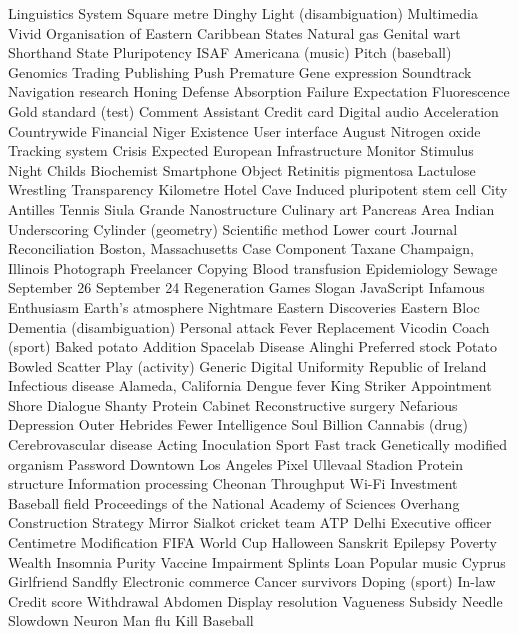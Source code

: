 Linguistics  System  Square metre  
Dinghy  Light (disambiguation)  Multimedia  
Vivid  Organisation of Eastern Caribbean States  Natural gas  
Genital wart  Shorthand  State  
Pluripotency  ISAF  Americana (music)  
Pitch (baseball)  Genomics  Trading  
Publishing  Push  Premature  
Gene expression  Soundtrack  Navigation research  
Honing  Defense  Absorption  
Failure  Expectation  Fluorescence  
Gold standard (test)  Comment  Assistant  
Credit card  Digital audio  Acceleration  
Countrywide Financial  Niger  Existence  
User interface  August  Nitrogen oxide  
Tracking system  Crisis  Expected  
European  Infrastructure  Monitor  
Stimulus  Night  Childs  
Biochemist  Smartphone  Object  
Retinitis pigmentosa  Lactulose  Wrestling  
Transparency  Kilometre  Hotel  
Cave  Induced pluripotent stem cell  City  
Antilles  Tennis  Siula Grande  
Nanostructure  Culinary art  Pancreas  
Area  Indian  Underscoring  
Cylinder (geometry)  Scientific method  Lower court  
Journal  Reconciliation  Boston, Massachusetts  
Case  Component  Taxane  
Champaign, Illinois  Photograph  Freelancer  
Copying  Blood transfusion  Epidemiology  
Sewage  September 26  September 24  
Regeneration  Games  Slogan  
JavaScript  Infamous  Enthusiasm  
Earth's atmosphere  Nightmare  Eastern  
Discoveries  Eastern Bloc  Dementia (disambiguation)  
Personal attack  Fever  Replacement  
Vicodin  Coach (sport)  Baked potato  
Addition  Spacelab  Disease  
Alinghi  Preferred stock  Potato  
Bowled  Scatter  Play (activity)  
Generic  Digital  Uniformity  
Republic of Ireland  Infectious disease  Alameda, California  
Dengue fever  King  Striker  
Appointment  Shore  Dialogue  
Shanty  Protein  Cabinet  
Reconstructive surgery  Nefarious  Depression  
Outer Hebrides  Fewer  Intelligence  
Soul  Billion  Cannabis (drug)  
Cerebrovascular disease  Acting  Inoculation  
Sport  Fast track  Genetically modified organism  
Password  Downtown Los Angeles  Pixel  
Ullevaal Stadion  Protein structure  Information processing  
Cheonan  Throughput  Wi-Fi  
Investment  Baseball field  Proceedings of the National Academy of Sciences  
Overhang  Construction  Strategy  
Mirror  Sialkot cricket team  ATP  
Delhi  Executive officer  Centimetre  
Modification  FIFA World Cup  Halloween  
Sanskrit  Epilepsy  Poverty  
Wealth  Insomnia  Purity  
Vaccine  Impairment  Splints  
Loan  Popular music  Cyprus  
Girlfriend  Sandfly  Electronic commerce  
Cancer survivors  Doping (sport)  In-law  
Credit score  Withdrawal  Abdomen  
Display resolution  Vagueness  Subsidy  
Needle  Slowdown  Neuron  
Man flu  Kill  Baseball  
